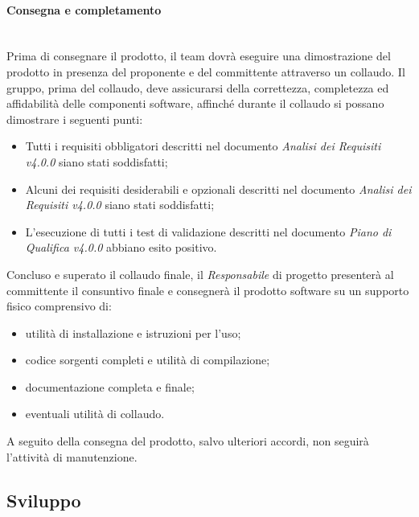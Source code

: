 \paragraph{Consegna e completamento} \-\\
Prima di consegnare il prodotto, il team dovrà eseguire una dimostrazione del prodotto in presenza del proponente e del committente attraverso un collaudo. Il gruppo, prima del collaudo, deve assicurarsi della correttezza, completezza ed affidabilità delle componenti software, affinché durante il collaudo si possano dimostrare i seguenti punti:
\begin{itemize}
	\item Tutti i requisiti obbligatori descritti nel documento \textit{Analisi dei Requisiti v4.0.0} siano stati soddisfatti;
	\item Alcuni dei requisiti desiderabili e opzionali descritti nel documento \textit{Analisi dei Requisiti v4.0.0} siano stati soddisfatti;
	\item L'esecuzione di tutti i test di validazione descritti nel documento \textit{Piano di Qualifica v4.0.0} abbiano esito positivo.
\end{itemize} 
Concluso e superato il collaudo finale, il \textit{Responsabile} di progetto presenterà al committente il consuntivo finale e consegnerà il prodotto software su un supporto fisico comprensivo di:
\begin{itemize}
	\item utilità di installazione e istruzioni per l'uso;
	\item codice sorgenti completi e utilità di compilazione;
	\item documentazione completa e finale;
	\item eventuali utilità di collaudo. 
\end{itemize}
A seguito della consegna del prodotto, salvo ulteriori accordi, non seguirà l'attività
di manutenzione.


\subsection{Sviluppo}\label{Sviluppo}
